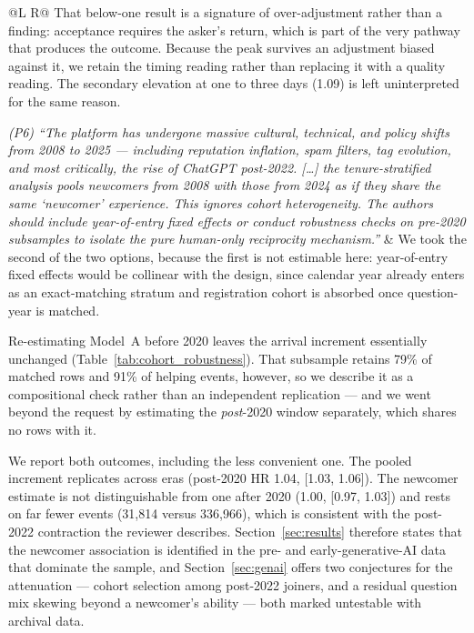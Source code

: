 \documentclass[11pt]{article}
\begin{document}
\begin{longtable}{@{}L R@{}}
That below-one result is a signature of over-adjustment rather than a finding: acceptance requires the asker's return, which is part of the very pathway that produces the outcome. Because the peak survives an adjustment biased against it, we retain the timing reading rather than replacing it with a quality reading. The secondary elevation at one to three days (1.09) is left uninterpreted for the same reason. \\
\midrule

\textit{(P6) ``The platform has undergone massive cultural, technical, and policy shifts from 2008 to 2025 --- including reputation inflation, spam filters, tag evolution, and most critically, the rise of ChatGPT post-2022. [\ldots] the tenure-stratified analysis pools newcomers from 2008 with those from 2024 as if they share the same `newcomer' experience. This ignores cohort heterogeneity. The authors should include year-of-entry fixed effects or conduct robustness checks on pre-2020 subsamples to isolate the pure human-only reciprocity mechanism.''} &
We took the second of the two options, because the first is not estimable here: year-of-entry fixed effects would be collinear with the design, since calendar year already enters as an exact-matching stratum and registration cohort is absorbed once question-year is matched.

Re-estimating Model~A before 2020 leaves the arrival increment essentially unchanged (Table~\ref{tab:cohort_robustness}). That subsample retains 79\% of matched rows and 91\% of helping events, however, so we describe it as a compositional check rather than an independent replication --- and we went beyond the request by estimating the \emph{post}-2020 window separately, which shares no rows with it.

We report both outcomes, including the less convenient one. The pooled increment replicates across eras (post-2020 HR 1.04, [1.03, 1.06]). The newcomer estimate is not distinguishable from one after 2020 (1.00, [0.97, 1.03]) and rests on far fewer events (31{,}814 versus 336{,}966), which is consistent with the post-2022 contraction the reviewer describes. Section~\ref{sec:results} therefore states that the newcomer association is identified in the pre- and early-generative-AI data that dominate the sample, and Section~\ref{sec:genai} offers two conjectures for the attenuation --- cohort selection among post-2022 joiners, and a residual question mix skewing beyond a newcomer's ability --- both marked untestable with archival data. \\
\midrule


\end{longtable}
\end{document}
